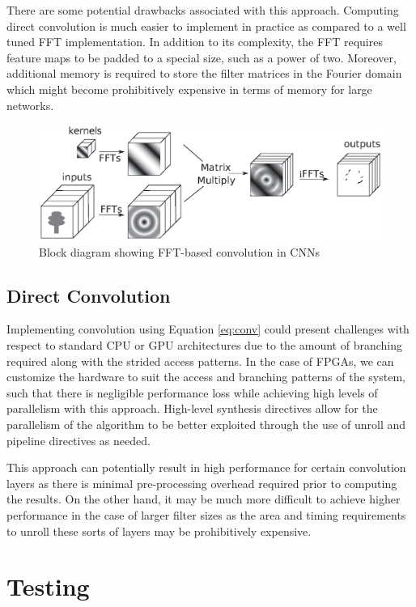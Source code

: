 \documentclass[conference,compsoc]{IEEEtran/IEEEtran}
\begin{document}
There are some potential drawbacks associated with this approach. Computing direct convolution is much easier to implement in practice as compared to a well tuned FFT implementation. In addition to its complexity, the FFT requires feature maps to be padded to a special size, such as a power of two. Moreover, additional memory is required to store the filter matrices in the Fourier domain which might become prohibitively expensive in terms of memory for large networks.
\begin{figure}[!h]
\begin{center}
\centering
\includegraphics[width=1\columnwidth]{CNN-FFT.eps}
\caption{Block diagram showing FFT-based convolution in CNNs}
\label{CNN-FFT}
\end{center}
\end{figure}
\subsection{Direct Convolution}
Implementing convolution using Equation \ref{eq:conv} could present challenges with respect to standard CPU or GPU architectures
due to the amount of branching required along with the strided access patterns. In the case of FPGAs, we can customize the hardware
to suit the access and branching patterns of the system, such that there is negligible performance loss while achieving high
levels of parallelism with this approach. High-level synthesis directives allow for the parallelism of the algorithm to be better
exploited through the use of unroll and pipeline directives as needed.

This approach can potentially result in high performance for certain convolution layers as there is minimal pre-processing overhead
required prior to computing the results. On the other hand, it may be much more difficult to achieve higher performance in the case of
larger filter sizes as the area and timing requirements to unroll these sorts of layers may be prohibitively expensive.



\section{Testing}\label{section:testing}
\end{document}

